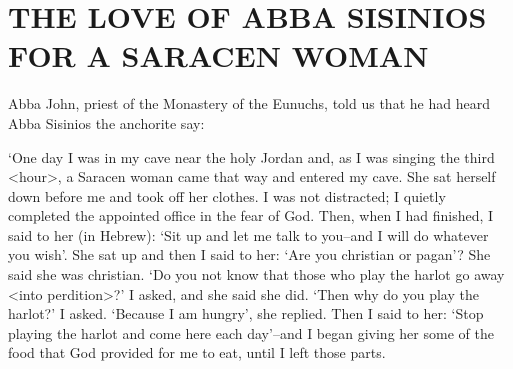 \chapter{THE LOVE OF ABBA SISINIOS FOR A SARACEN WOMAN}

Abba John, priest of the Monastery of the Eunuchs, told us that he
had heard Abba Sisinios the anchorite say:

`One day I was in my cave near the holy Jordan and, as I was singing the third <hour>, a Saracen woman came that way and entered my cave.
She sat herself down before me and took off her clothes.
I was not distracted;
I quietly completed the appointed office in the fear of God.
Then, when I had finished, I said to her (in Hebrew): `Sit up and let me talk to you--and I will do whatever you wish'.
She sat up and then I said to her: `Are you christian or pagan'?
She said she was christian.
`Do you not know that those who play the harlot go away <into perdition>?'
I asked, and she said she did.
`Then why do you play the harlot?' I asked.
`Because I am hungry', she replied.
Then I said to her: `Stop playing the harlot and come here each day'--and I began giving her some of the food that God provided for me to eat, until I left those parts.

